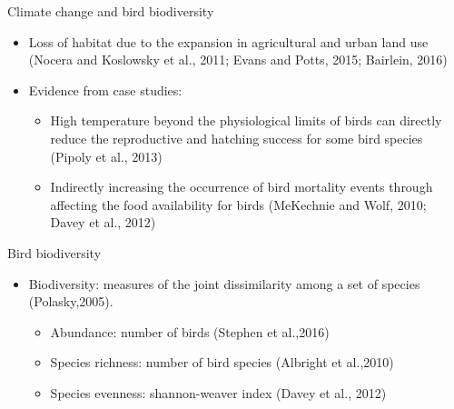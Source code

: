 \documentclass{beamer}
\begin{document}
\begin{frame}{Climate change and bird biodiversity}
\begin{itemize}
  \item Loss of habitat due to the expansion in agricultural and urban land use (Nocera and Koslowsky et al., 2011; Evans and Potts, 2015; Bairlein, 2016)
  \item Evidence from case studies:
  \begin{itemize}
  \item High temperature beyond the physiological limits of birds can directly reduce the reproductive and hatching success for some bird species (Pipoly et al., 2013)
  \item Indirectly increasing the occurrence of bird mortality events through affecting the food availability for birds (MeKechnie and Wolf, 2010; Davey et al., 2012)
   \end{itemize}
\end{itemize}
\end{frame}


\begin{frame}{Bird biodiversity}
  \begin{itemize}
    \item Biodiversity: measures of the joint dissimilarity among a set of species (Polasky,2005).
    \begin{itemize}
      \item Abundance: number of birds (Stephen et al.,2016)
      \item Species richness: number of bird species (Albright et al.,2010)
      \item Species evenness: shannon-weaver index (Davey et al., 2012)
    \end{itemize}
  \end{itemize}
\end{frame}
\end{document}
